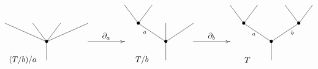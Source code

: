 \documentclass[../main.tex]{subfiles}
\begin{document}
\begin{equation}
    \xy
    <0.08cm, 0cm>:
    (0.0, 0.0)*{}="1"; %
    (0.0, 10.0)*=0{\bullet}="2"; %
    (-22.5, 20.0)*{}="3"; %
    (-7.5, 20.0)*{}="4"; %
    (7.5, 20.0)*{}="5"; %
    (22.5, 20.0)*{}="6"; %
    "1";"2" **\dir{-};
    "2";"3" **\dir{-};
    "2";"4" **\dir{-};
    "2";"5" **\dir{-};
    "2";"6" **\dir{-};
    (-13,0)*{(T/b)/a};
    \endxy
    \xy
    <0.08cm, 0cm>:
    (-10, 0.0)*{}="1";
    (10, 0.0)*{}="2";
    (10, 10)*{}="3";
    (-10, 0)*{}="4";
    {\ar(-10, 10)*{};(10,10)*{}};
    (0,13)*{\partial_a};
    \endxy
    \xy
    <0.08cm, 0cm>:
    (0.0, 0.0)*{}="1"; %
    (0.0, 10.0)*=0{\bullet}="2"; %
    (-15.0, 20.0)*=0{\bullet}="3"; %
    (-22.5, 30.0)*{}="4"; %
    (-7.5, 30.0)*{}="5"; %
    (0.0, 20.0)*{}="6"; %
    (15.0, 20.0)*{}="7"; %
    "1";"2" **\dir{-};
    "2";"3" **\dir{-};
    "3";"4" **\dir{-};
    "3";"5" **\dir{-};
    "2";"6" **\dir{-};
    "2";"7" **\dir{-};
    (-11.5, 15.0)*=0{\scriptstyle a};
    (-13,0)*{T/b};
    \endxy
    \xy
    <0.08cm, 0cm>:
    (-10, 0.0)*{}="1";
    (10, 0.0)*{}="2";
    (10, 10)*{}="3";
    (-10, 0)*{}="4";
    {\ar(-10, 10)*{};(10,10)*{}};
    (0,13)*{\partial_b};
    \endxy
    \xy
    <0.08cm, 0cm>:
    (0.0, 0.0)*{}="1"; %
    (0.0, 10.0)*=0{\bullet}="2"; %
    (-15.0, 20.0)*=0{\bullet}="3"; %
    (-22.5, 30.0)*{}="4"; %
    (-7.5, 30.0)*{}="5"; %
    (15.0, 20.0)*=0{\bullet}="6"; %
    (7.5, 30.0)*{}="7"; %
    (22.5, 30.0)*{}="8"; %
    "1";"2" **\dir{-};
    "2";"3" **\dir{-};
    "3";"4" **\dir{-};
    "3";"5" **\dir{-};
    "2";"6" **\dir{-};
    "6";"7" **\dir{-};
    "6";"8" **\dir{-};
    (-9.5, 14.0)*=0{\scriptstyle a};
    (11.5, 15.0)*=0{\scriptstyle b};
    (-13,0)*{T};
    \endxy
\end{equation}
\end{document}
